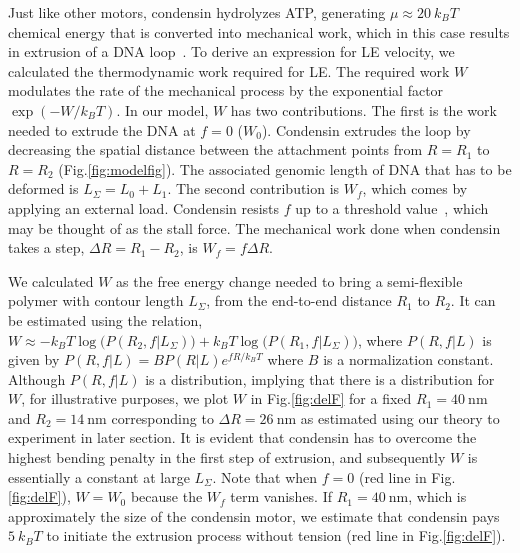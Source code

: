 \documentclass[fleqn,10pt]{wlscirep}
\newcommand{\nm}{\ \mathrm{nm}}
\newcommand{\vR}{R}
\newcommand{\vL}{L}
\newcommand{\DR}{\Delta {R}}
\begin{document}
Just like other motors, condensin hydrolyzes ATP, generating $\mu \approx 20\ k_BT$ chemical energy that is converted into mechanical work, which in this case results in extrusion of a DNA loop~\cite{ganji2018real}. To derive an expression for LE velocity, we calculated the thermodynamic work required for LE. The required work $W$ modulates the rate of the mechanical process by the exponential factor $\exp(-W/k_BT)$. In our model, $W$ has two contributions. The first  is the work needed to extrude the DNA at $f=0$ ($W_{0}$). Condensin extrudes the loop by decreasing the spatial distance between the attachment points from $\vR=R_1$ to $\vR=R_2$ (Fig.\ref{fig:modelfig}). 
The associated genomic length of DNA that has to be deformed is $L_{\Sigma} = L_0 + L_1$.  
The second contribution is $W_{f}$, which comes by applying  an external load.  Condensin resists $f$ up to a threshold value~\cite{ganji2018real}, which may be thought of as the stall force. The mechanical work done when condensin takes a step, $\DR=R_1-R_2$, is $W_{f}= f \DR$. 


We calculated $W$ as the free energy change needed to bring a semi-flexible polymer with contour length $L_\Sigma$, from the end-to-end distance $R_1$ to $R_2$. It can be estimated using the relation, $W \approx -k_BT\log \big(P(R_2,f|L_\Sigma)\big)+ k_BT\log\big(P(R_1,f|L_\Sigma)\big) $, where $P(\vR,f|\vL)$ is given by $P(\vR,f|\vL) = B P(\vR|\vL)e^{f R/k_BT}$ where $B$ is a  normalization constant.   
Although $P(\vR,f|\vL)$ is a distribution, implying that there is a distribution for $W$,  for illustrative purposes, we plot $W$ in Fig.\ref{fig:delF} for a fixed $R_1=40\nm$ and $R_2=14\nm$ corresponding to $\Delta R= 26\nm$ as estimated using our theory to experiment in later section. It is evident that condensin has to overcome the highest bending penalty in the first step of extrusion, and subsequently $W$ is essentially a constant at large $L_{\Sigma}$. Note that when $f=0$ (red line in Fig.\ref{fig:delF}), $W=W_0$ because the $W_f$ term vanishes.  
If $R_1=40 \nm$, which is approximately the size of the condensin motor, we estimate that condensin pays $5\ k_BT$  to initiate the extrusion process without tension (red line in Fig.\ref{fig:delF}). %
\end{document}
